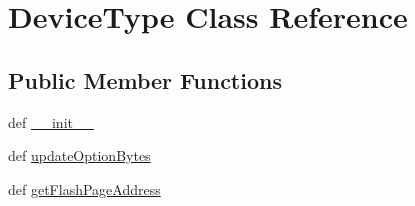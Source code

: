 \hypertarget{classstm__tools_1_1serialflasher_1_1devices_1_1DeviceType}{}\section{Device\+Type Class Reference}
\label{classstm__tools_1_1serialflasher_1_1devices_1_1DeviceType}
\subsection*{Public Member Functions}
\begin{DoxyCompactItemize}
\item 
def \hyperlink{classstm__tools_1_1serialflasher_1_1devices_1_1DeviceType_ac775ee34451fdfa742b318538164070e}{\+\_\+\+\_\+init\+\_\+\+\_\+}
\item 
def \hyperlink{classstm__tools_1_1serialflasher_1_1devices_1_1DeviceType_af80ad02979239c2550bd7e104e033566}{update\+Option\+Bytes}
\item 
def \hyperlink{classstm__tools_1_1serialflasher_1_1devices_1_1DeviceType_ae57fa7cefa4fcfdef06179d37b0a0a43}{get\+Flash\+Page\+Address}
\end{DoxyCompactItemize}
